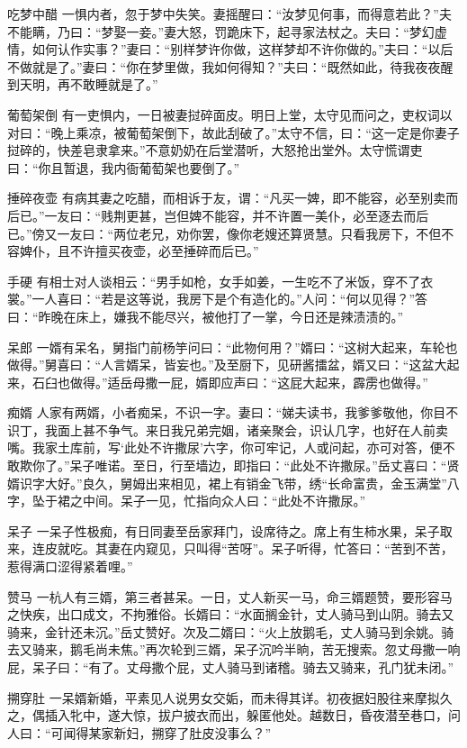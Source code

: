 \documentclass[12pt,UTF8]{ctexbook}
\begin{document}
吃梦中醋
一惧内者，忽于梦中失笑。妻摇醒曰：“汝梦见何事，而得意若此？”夫不能瞒，乃曰：“梦娶一妾。”妻大怒，罚跪床下，起寻家法杖之。夫曰：“梦幻虚情，如何认作实事？”妻曰：“别样梦许你做，这样梦却不许你做的。”夫曰：“以后不做就是了。”妻曰：“你在梦里做，我如何得知？”夫曰：“既然如此，待我夜夜醒到天明，再不敢睡就是了。”

葡萄架倒
有一吏惧内，一日被妻挝碎面皮。明日上堂，太守见而问之，吏权词以对曰：“晚上乘凉，被葡萄架倒下，故此刮破了。”太守不信，曰：“这一定是你妻子挝碎的，快差皂隶拿来。”不意奶奶在后堂潜听，大怒抢出堂外。太守慌谓吏曰：“你且暂退，我内衙葡萄架也要倒了。”

捶碎夜壶
有病其妻之吃醋，而相诉于友，谓：“凡买一婢，即不能容，必至别卖而后已。”一友曰：“贱荆更甚，岂但婢不能容，并不许置一美仆，必至逐去而后已。”傍又一友曰：“两位老兄，劝你罢，像你老嫂还算贤慧。只看我房下，不但不容婢仆，且不许擅买夜壶，必至捶碎而后已。”

手硬
有相士对人谈相云：“男手如枪，女手如姜，一生吃不了米饭，穿不了衣裳。”一人喜曰：“若是这等说，我房下是个有造化的。”人问：“何以见得？”答曰：“昨晚在床上，嫌我不能尽兴，被他打了一掌，今日还是辣渍渍的。”

呆郎
一婿有呆名，舅指门前杨竽问曰：“此物何用？”婿曰：“这树大起来，车轮也做得。”舅喜曰：“人言婿呆，皆妄也。”及至厨下，见研酱擂盆，婿又曰：“这盆大起来，石臼也做得。”适岳母撒一屁，婿即应声曰：“这屁大起来，霹雳也做得。”

痴婿
人家有两婿，小者痴呆，不识一字。妻曰：“娣夫读书，我爹爹敬他，你目不识丁，我面上甚不争气。来日我兄弟完姻，诸亲聚会，识认几字，也好在人前卖嘴。我家土库前，写‘此处不许撒尿’六字，你可牢记，人或问起，亦可对答，便不敢欺你了。”呆子唯诺。至日，行至墙边，即指曰：“此处不许撒尿。”岳丈喜曰：“贤婿识字大好。”良久，舅姆出来相见，裙上有销金飞带，绣“长命富贵，金玉满堂”八字，坠于裙之中间。呆子一见，忙指向众人曰：“此处不许撒尿。”

呆子
一呆子性极痴，有日同妻至岳家拜门，设席待之。席上有生柿水果，呆子取来，连皮就吃。其妻在内窥见，只叫得“苦呀”。呆子听得，忙答曰：“苦到不苦，惹得满口涩得紧着哩。”

赞马
一杭人有三婿，第三者甚呆。一日，丈人新买一马，命三婿题赞，要形容马之快疾，出口成文，不拘雅俗。长婿曰：“水面搁金针，丈人骑马到山阴。骑去又骑来，金针还未沉。”岳丈赞好。次及二婿曰：“火上放鹅毛，丈人骑马到余姚。骑去又骑来，鹅毛尚未焦。”再次轮到三婿，呆子沉吟半晌，苦无搜索。忽丈母撒一响屁，呆子曰：“有了。丈母撒个屁，丈人骑马到诸稽。骑去又骑来，孔门犹未闭。”

搠穿肚
一呆婿新婚，平素见人说男女交姤，而未得其详。初夜据妇股往来摩拟久之，偶插入牝中，遂大惊，拔户披衣而出，躲匿他处。越数日，昏夜潜至巷口，问人曰：“可闻得某家新妇，搠穿了肚皮没事么？”
\end{document}
